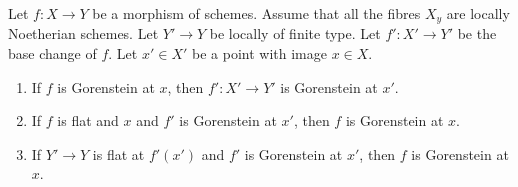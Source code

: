 \begin{lemma}
\label{lemma-base-change-gorenstein}
Let $f : X \to Y$ be a morphism of schemes.
Assume that all the fibres $X_y$ are locally Noetherian schemes.
Let $Y' \to Y$ be locally of finite type. Let $f' : X' \to Y'$
be the base change of $f$.
Let $x' \in X'$ be a point with image $x \in X$.
\begin{enumerate}
\item If $f$ is Gorenstein at $x$, then
$f' : X' \to Y'$ is Gorenstein at $x'$.
\item If $f$ is flat and $x$ and $f'$ is Gorenstein at $x'$, then $f$
is Gorenstein at $x$.
\item If $Y' \to Y$ is flat at $f'(x')$ and $f'$ is Gorenstein at
$x'$, then $f$ is Gorenstein at $x$.
\end{enumerate}
\end{lemma}

